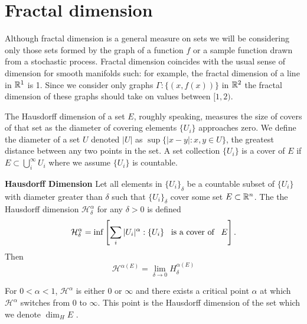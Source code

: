 \section{Fractal dimension}

Although fractal dimension is a general measure on sets
we will be considering only those sets formed by the 
graph of a function $f$ or a sample function 
drawn from a stochastic process. Fractal dimension 
coincides with the usual sense of 
dimension for smooth manifolds such: for example, the 
fractal dimension of a line in $\mathbb R^1$ is 1. 
Since we consider only graphs
 $\Gamma:\{ (x, f(x)) \}$ in $\mathbb R^2$
the fractal dimension of these graphs should take on 
values between $[1,2)$.

The Hausdorff dimension of a set $E$, roughly speaking, 
measures the size of covers of that set 
as the diameter of covering elements
$\{ U_i \}$ approaches zero. We define the diameter 
of a set $U$ denoted $|U|$ as 
$\sup \{ | x- y| : x, y \in U\}$, the greatest distance 
between any two points in the set. A set collection 
$ \{ U_i \}$ is 
a cover of $E$ if $E \subset \bigcup_i^{\infty} U_i$
where we assume $\{ U_i \}$ is countable. 

\begin{defn}{\textbf{Hausdorff Dimension} }
Let all elements in $ \{ U_i \}_{\delta}$ be a
countable subset of $\{ U_i \}$ with diameter greater 
than $\delta$ such that $\{ U_i \}_{\delta}$ cover 
some set $E \subset \mathbb R^n$. The the Hausdorff dimension 
$\mathcal{H}_{\delta}^{\alpha}$ for any $\delta > 0$ 
is defined 
\begin{align*}
  \mathcal{H}_{\delta}^{\alpha} = \inf 
    \left[ \sum_i | U_i |^{\alpha} : \{ U_i \} \hspace{0.5em}\text{ is  a cover of  }\hspace{0.5em} E \right].
\end{align*}  
Then 
$$
\mathcal{H}^{\alpha(E)}=\lim_{\delta\to 0} H^{\alpha(E)}_\delta
$$

\end{defn}

For $0 < \alpha < 1$, $\mathcal{H}^{\alpha}$ is 
either $0$ or $\infty$ and there exists a critical point 
$\alpha$ at which $\mathcal{H}^{\alpha}$ switches from $0$ to 
$\infty$. This point is the Hausdorff dimension of the set 
which we denote $\dim_H E$ \cite{falconer2003}. 

